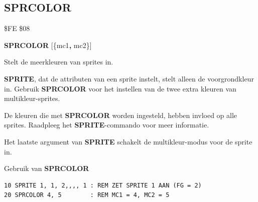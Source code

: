 
\newpage
\subsection{SPRCOLOR}
\begin{description}[leftmargin=2cm,style=nextline]
\item [Token:]    \$FE \$08

\item [Formaat:]   {\bf SPRCOLOR} [\{mc1{\bf,} mc2\}]

\item [Gebruik:]    Stelt de meerkleuren van sprites in.

                  {\bf SPRITE}, dat de attributen van een sprite instelt, stelt alleen de voorgrondkleur in. Gebruik {\bf SPRCOLOR} voor het instellen van de twee extra kleuren van multikleur-sprites.

\item [Opmerkingen:]  De kleuren die met {\bf SPRCOLOR} worden ingesteld, hebben invloed op alle sprites. Raadpleeg het {\bf SPRITE}-commando voor meer informatie.

                  Het laatste argument van {\bf SPRITE} schakelt de multikleur-modus voor de sprite in.

\item [Voorbeeld:]  Gebruik van {\bf SPRCOLOR}

\begin{tcolorbox}[colback=black,coltext=white]
\verbatimfont{\codefont}
\begin{verbatim}
10 SPRITE 1, 1, 2,,,, 1 : REM ZET SPRITE 1 AAN (FG = 2)
20 SPRCOLOR 4, 5        : REM MC1 = 4, MC2 = 5
\end{verbatim}
\end{tcolorbox}
\end{description}


\newpage
